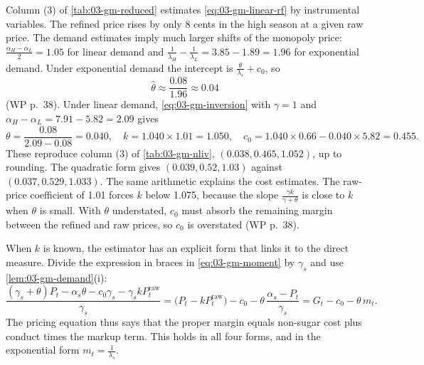 Column (3) of \cref{tab:03-gm-reduced} estimates \eqref{eq:03-gm-linear-rf} by instrumental variables. The
refined price rises by only 8 cents in the high season at a given raw price. The demand estimates imply
much larger shifts of the monopoly price: $\frac{\alpha_H - \alpha_L}{2} = 1.05$ for linear demand and
$\frac{1}{\lambda_H} - \frac{1}{\lambda_L} = 3.85 - 1.89 = 1.96$ for exponential demand. Under exponential
demand the intercept is $\frac{\theta}{\lambda_s} + c_0$, so
\begin{equation*}
\hat\theta \approx \frac{0.08}{1.96} \approx 0.04
\end{equation*}
(WP p.~38). Under linear demand, \eqref{eq:03-gm-inversion} with $\gamma = 1$ and $\alpha_H - \alpha_L =
7.91 - 5.82 = 2.09$ gives
\begin{equation*}
\theta = \frac{0.08}{2.09 - 0.08} = 0.040,
\quad
k = 1.040 \times 1.01 = 1.050,
\quad
c_0 = 1.040 \times 0.66 - 0.040 \times 5.82 = 0.455 .
\end{equation*}
These reproduce column (3) of \cref{tab:03-gm-nliv}, $(0.038, 0.465, 1.052)$, up to rounding. The quadratic form
gives $(0.039, 0.52, 1.03)$ against $(0.037, 0.529, 1.033)$. The same arithmetic explains the cost
estimates. The raw-price coefficient of 1.01 forces $k$ below 1.075, because the slope $\frac{\gamma
k}{\gamma + \theta}$ is close to $k$ when $\theta$ is small. With $\theta$ understated, $c_0$ must absorb
the remaining margin between the refined and raw prices, so $c_0$ is overstated (WP p.~38).

When $k$ is known, the estimator has an explicit form that links it to the direct measure. Divide the
expression in braces in \eqref{eq:03-gm-moment} by $\gamma_s$ and use \cref{lem:03-gm-demand}(i):
\begin{equation*}
\frac{(\gamma_s + \theta)P_t - \alpha_s\theta - c_0\gamma_s - \gamma_s k P^{\mathrm{raw}}_t}{\gamma_s}
= \big(P_t - kP^{\mathrm{raw}}_t\big) - c_0 - \theta\,\frac{\alpha_s - P_t}{\gamma_s}
= G_t - c_0 - \theta\, m_t .
\end{equation*}
The pricing equation thus says that the proper margin equals non-sugar cost plus conduct times the markup
term. This holds in all four forms, and in the exponential form $m_t = \frac{1}{\lambda_s}$.

